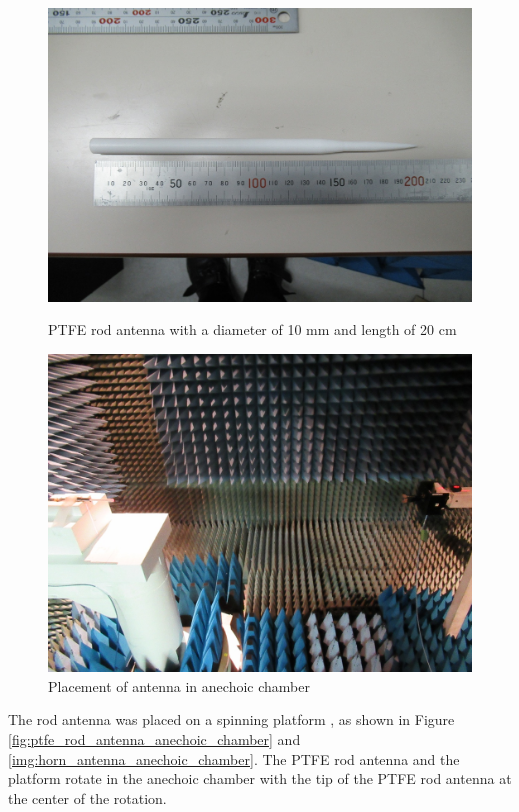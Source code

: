 \documentclass[a4paper,12pt]{report}
\begin{document}
\begin{figure}
  \centering
  \begin{minipage}{0.45\textwidth}
    \centering
    \includegraphics[clip, keepaspectratio, width=0.9\linewidth]{img/ptfe_rod_antenna_20cm.jpg}
    \caption{PTFE rod antenna with a diameter of 10 mm and length of 20 cm}
    \label{fig:ptfe_rod_antenna_20cm} 
  \end{minipage}\hfill
  \begin{minipage}{0.45\textwidth}
    \centering
    \includegraphics[clip, keepaspectratio, width=0.9\linewidth]{img/anechoic_chamber_120_centimeters.jpg}
    \caption{Placement of antenna in anechoic chamber}
    \label{img:anechoic_chamber_120_centimeters}
  \end{minipage}\hfill
\end{figure}

The rod antenna was placed on a spinning platform ,
as shown in Figure \ref{fig:ptfe_rod_antenna_anechoic_chamber}
and \ref{img:horn_antenna_anechoic_chamber}.
The PTFE rod antenna and the platform rotate in the anechoic chamber
with the tip of the PTFE rod antenna at the center of the rotation.
\end{document}
